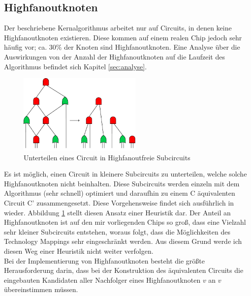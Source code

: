 \documentclass[11pt, a4paper, german]{article}
\begin{document}
\subsection{Highfanoutknoten}
\label{subsec:highfanout}
Der beschriebene Kernalgorithmus arbeitet nur auf Circuits, in denen keine Highfanoutknoten existieren. Diese kommen auf einem realen Chip jedoch sehr häufig vor; ca. $30\%$ der Knoten sind Highfanoutknoten. Eine Analyse über die Auswirkungen von der Anzahl der Highfanoutknoten auf die Laufzeit des Algorithmus befindet sich Kapitel \ref{sec:analyse}.\\
 \begin{figure}
		\includegraphics[width = 6cm]{pictures/compiled/ohne_highfanout_heu}
		\caption{Unterteilen eines Circuit in Highfanoutfreie Subcircuits}
		\label{bild:ohne_highfanout_heu}
\end{figure}
 Es ist möglich, einen Circuit in kleinere Subcircuits zu unterteilen, welche solche Highfanoutknoten nicht beinhalten. Diese Subcircuits werden einzeln mit dem Algorithmus (sehr schnell) optimiert und daraufhin zu einem C äquivalenten Circuit C' zusammengesetzt. Diese Vorgehensweise findet sich ausführlich in \cite{DAGON} wieder. Abbildung \ref{bild:ohne_highfanout_heu} stellt diesen Ansatz einer Heuristik dar. 
  Der Anteil an Highfanoutknoten ist auf den mir vorliegenden Chips so groß, dass eine Vielzahl sehr kleiner Subcircuits entstehen, woraus folgt, dass die Möglichkeiten des Technology Mappings sehr eingeschränkt werden. Aus diesem Grund werde ich diesen Weg einer Heuristik nicht weiter verfolgen.\\

Bei der Implementierung von Highfanoutknoten besteht die größte Herausforderung darin, dass bei der Konstruktion des äquivalenten Circuits die eingebauten Kandidaten aller Nachfolger eines Highfanoutknoten $v$ an $v$ übereinstimmen müssen.\\
\newpage
 
\end{document}
